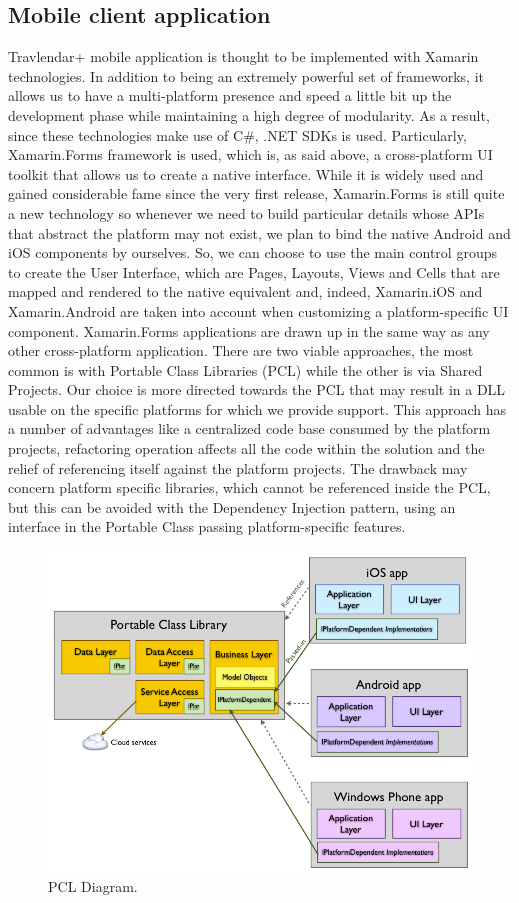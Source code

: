 \subsection*{Mobile client application}
Travlendar+ mobile application is thought to be implemented with Xamarin technologies. In addition to being an extremely powerful set of frameworks, it allows us to have a multi-platform presence and speed a little bit up the development phase while maintaining a high degree of modularity.
As a result, since these technologies make use of C\#, .NET SDKs is used. Particularly, Xamarin.Forms framework is used, which is, as said above, a cross-platform UI toolkit that allows us to create a native interface. While it is widely used and gained considerable fame since the very first release, Xamarin.Forms is still quite a new technology so whenever we need to build particular details whose APIs that abstract the platform may not exist, we plan to bind the native Android and iOS components by ourselves. So, we can choose to use the main control groups to create the User Interface, which are Pages, Layouts, Views and Cells that are mapped and rendered to the native equivalent and, indeed, Xamarin.iOS and Xamarin.Android are taken into account when customizing a platform-specific UI component.
Xamarin.Forms applications are drawn up in the same way as any other cross-platform application. There are two viable approaches, the most common is with Portable Class Libraries (PCL) while the other is via Shared Projects.
Our choice is more directed towards the PCL that may result in a DLL usable on the specific platforms for which we provide support. This approach has a number of advantages like a centralized code base consumed by the platform projects, refactoring operation affects all the code within the solution and the relief of referencing itself against the platform projects. 
The drawback may concern platform specific libraries, which cannot be referenced inside the PCL, but this can be avoided with the Dependency Injection pattern, using an interface in the Portable Class passing platform-specific features.
\begin{figure}
	\centering
	\includegraphics[width=6in]{diagrams/PCLDiagram.png} 
	\caption{PCL Diagram.}   
\end{figure}

